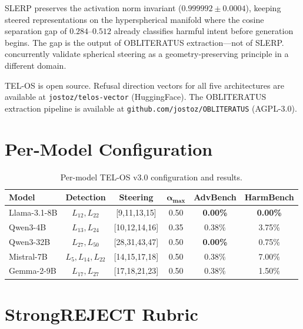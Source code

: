 \documentclass{article}
\begin{document}
SLERP preserves the activation norm invariant ($0.999992 \pm 0.0004$), keeping
steered representations on the hyperspherical manifold where the cosine separation
gap of $0.284$--$0.512$ already classifies harmful intent before generation begins.
The gap is the output of \textsc{OBLITERATUS} extraction---not of SLERP.
\citet{you2026spherical} concurrently validate spherical steering as a
geometry-preserving principle in a different domain.

TEL-OS is open source.
Refusal direction vectors for all five architectures are available at
\texttt{jostoz/telos-vector} (HuggingFace).
The \textsc{OBLITERATUS} extraction pipeline is available at
\texttt{github.com/jostoz/OBLITERATUS} (AGPL-3.0).



\appendix

\section{Per-Model Configuration}
\label{app:config}

\begin{table}[h]
\centering
\caption{Per-model TEL-OS v3.0 configuration and results.}
\label{tab:app_config}
\begin{tabular}{lccccc}
\toprule
\textbf{Model} & \textbf{Detection} & \textbf{Steering} &
$\boldsymbol{\alpha_{\max}}$ & \textbf{AdvBench} & \textbf{HarmBench} \\
\midrule
Llama-3.1-8B & $L_{12}, L_{22}$         & [9,11,13,15]  & 0.50 & \textbf{0.00\%} & \textbf{0.00\%} \\
Qwen3-4B     & $L_{13}, L_{24}$         & [10,12,14,16] & 0.35 & 0.38\%          & 3.75\% \\
Qwen3-32B    & $L_{27}, L_{50}$         & [28,31,43,47] & 0.50 & \textbf{0.00\%} & 0.75\% \\
Mistral-7B   & $L_{5}, L_{14}, L_{22}$ & [14,15,17,18] & 0.50 & 0.38\%          & 7.00\% \\
Gemma-2-9B   & $L_{17}, L_{27}$         & [17,18,21,23] & 0.50 & 0.38\%          & 1.50\% \\
\bottomrule
\end{tabular}
\end{table}

\section{StrongREJECT Rubric}
\label{app:strongreject}
\end{document}
